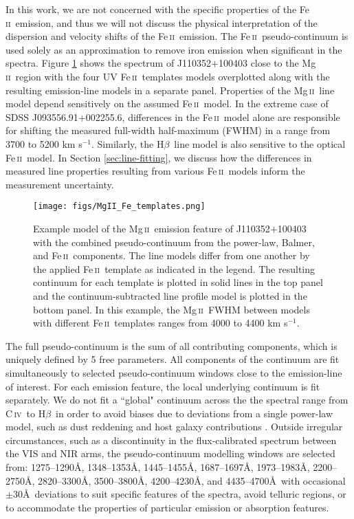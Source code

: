 \documentclass[fleqn,usenatbib]{mnras}
\newcommand{\mgii}{Mg\,\textsc{ii}}
\newcommand{\civ}{C\,\textsc{iv}}
\newcommand{\feii}{Fe\,\textsc{ii}}
\newcommand{\hbeta}{H\textsc{$\beta$}}
\begin{document}
In this work, we are not concerned with the specific properties of the \feii\ emission, and thus we will not discuss the physical interpretation of the dispersion and velocity shifts of the \feii\ emission. The \feii\ pseudo-continuum is used solely as an approximation to remove iron emission when significant in the spectra. Figure \ref{fig:Fe_templates_sample} shows the spectrum of J110352$+$100403 close to the \mgii\ region with the four UV \feii\ templates models overplotted along with the resulting emission-line models in a separate panel. Properties of the \mgii\ line model depend sensitively on the assumed \feii\ model. In the extreme case of SDSS J093556.91$+$002255.6, differences in the \feii\ model alone are responsible for shifting the measured full-width half-maximum (FWHM) in a range from 3700 to 5200 km s$^{-1}$. Similarly, the \hbeta\ line model is also sensitive to the optical \feii\ model. In Section \ref{sec:line-fitting}, we discuss how the differences in measured line properties resulting from various \feii\ models inform the measurement uncertainty.

\begin{figure}
	\texttt{[image: figs/MgII\_Fe\_templates.png]}
    \caption{Example model of the \mgii\ emission feature of J110352$+$100403 with the combined pseudo-continuum from the power-law, Balmer, and \feii\ components. The line models differ from one another by the applied \feii\ template as indicated in the legend. The resulting continuum for each template is plotted in solid lines in the top panel and the continuum-subtracted line profile model is plotted in the bottom panel. In this example, the \mgii\ FWHM between models with different \feii\ templates ranges from 4000 to 4400 km s$^{-1}$.}
    \label{fig:Fe_templates_sample}
\end{figure}

The full pseudo-continuum is the sum of all contributing components, which is uniquely defined by 5 free parameters. All components of the continuum are fit simultaneously to selected pseudo-continuum windows close to the emission-line of interest. For each emission feature, the local underlying continuum is fit separately. We do not fit a ``global" continuum across the the spectral range from \civ\ to \hbeta\ in order to avoid biases due to deviations from a single power-law model, such as dust reddening \citep[e.g.,][]{Richards_2003} and host galaxy contributions \citep[e.g.,][]{VandenBerk_2001}. Outside irregular circumstances, such as a discontinuity in the flux-calibrated spectrum between the VIS and NIR arms, the pseudo-continuum modelling windows are selected from: 1275--1290\AA, 1348--1353\AA, 1445--1455\AA, 1687--1697\AA, 1973--1983\AA, 2200--2750\AA, 2820--3300\AA, 3500--3800\AA, 4200--4230\AA, and 4435--4700\AA\ with occasional $\pm30$\AA\ deviations to suit specific features of the spectra, avoid telluric regions, or to accommodate the properties of particular emission or absorption features.
\end{document}
